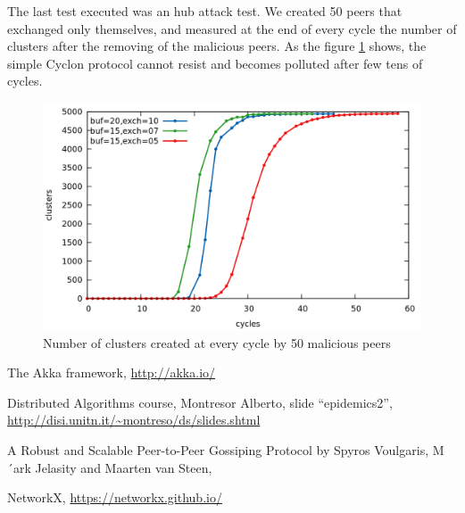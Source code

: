 \documentclass[a4paper,12pt,notitlepage]{article} %
\begin{document}
The last test executed was an hub attack test. We created 50 peers that exchanged only themselves, and measured
 at the end of every cycle the number of clusters after the removing of the malicious peers. As the 
 figure \ref{attack} shows, the simple Cyclon protocol cannot resist and becomes polluted after few tens of cycles.

\begin{figure} [H]
	\centering
	\includegraphics[width=1\textwidth]{img/attack}
	\caption{Number of clusters created at every cycle by 50 malicious peers}
	\label{attack}
\end{figure}



\begin{thebibliography}{9}

  The Akka framework,
  \url{http://akka.io/}

  Distributed Algorithms course,
  Montresor Alberto,
  slide ``epidemics2'',
  \url{http://disi.unitn.it/~montreso/ds/slides.shtml}


  A Robust and Scalable Peer-to-Peer Gossiping Protocol by
  Spyros Voulgaris, M´ark Jelasity and Maarten van Steen,

  NetworkX,
  \url{https://networkx.github.io/}



\end{thebibliography}
\end{document}

